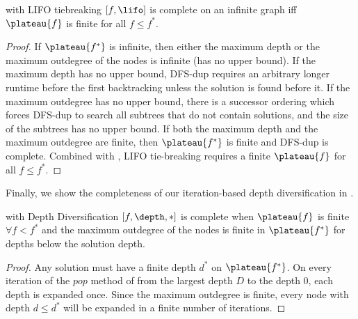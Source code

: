 \begin{propo} %
 \astar with LIFO tiebreaking $[f,\lifo]$ is complete on an infinite graph iff
 $\plateau{f}$ is finite for all $f\leq f^*$.
\end{propo}

\begin{proof}
 If $\plateau{f^*}$ is infinite, then
 either the maximum depth or the maximum outdegree of the nodes is infinite (has no upper bound).
 If the maximum depth has no upper bound,
 DFS-dup requires an arbitrary longer runtime before the first backtracking
 unless the solution is found before it.
 If the maximum outdegree has no upper bound,
 there is a successor ordering which forces DFS-dup
 to search all subtrees that do not contain solutions, and
 the size of the subtrees has no upper bound.
 If both the maximum depth and the maximum outdegree are finite, then $\plateau{f^*}$ is finite
 and DFS-dup is complete.
 Combined with ,
 LIFO tie-breaking requires a finite $\plateau{f}$ for all $f\leq f^*$.
\end{proof}

Finally, we show the completeness of our iteration-based depth diversification in .

\begin{theo}
 \astar with Depth Diversification $[f,\depth,*]$ is complete %
when  $\plateau{f}$ is finite  $\forall f<f^*$ and
 the maximum outdegree of the nodes is finite in $\plateau{f^*}$ for depths below the solution depth.
\end{theo}
 
\begin{proof}
 Any solution must have a finite depth $d^*$ on $\plateau{f^*}$.
 On every iteration of the $pop$ method of  from the largest depth $D$ to the depth 0, each depth is expanded once.
 Since the maximum outdegree is finite,
 every node with depth $d\leq d^*$ will be expanded in a finite number of iterations.
\end{proof}

